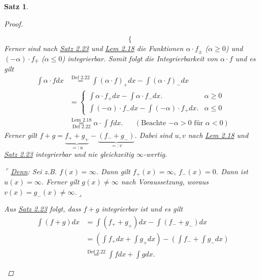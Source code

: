 \documentclass[a4paper]{report}
\newcommand{\jemph}{\uline}
\newcommand{\jshortlink}[1]{\jhyperref{#1}{\text{#1}}}
\newcommand{\jhyperref}[2]{\hyperref[j_#1]{#2}}
\newcommand{\jlink}[1]{\jhyperref{#1}{#1}}
\newcommand{\jspacesmall}{\vspace{4pt}}
\theoremstyle{plain}
\newtheorem{satz}[thm]{Satz}
\theoremstyle{definition}
\begin{document}
{{{{\begin{satz}
\begin{proof}
\begin{enumerate}
\begin{displaymath}
\begin{cases}
                                          \end{cases}
                \end{displaymath}
                Ferner sind nach \jlink{Satz 2.23} und \jlink{Lem 2.18} die Funktionen $\alpha\cdot f_\pm$ ($\alpha \ge 0$) und $(-\alpha)\cdot f_\mp$ ($\alpha \le 0$) integrierbar. Somit folgt die Integrierbarkeit von $\alpha\cdot f$ und es gilt
                \begin{displaymath}
                    \begin{split}
                        \int \alpha\cdot f dx &\overset{\jshortlink{Def 2.22}}{=} \int (\alpha\cdot f)_+ dx - \int (\alpha\cdot f)_-dx\\
                        &= \begin{cases}
                               \int \alpha\cdot f_+ dx - \int \alpha \cdot f_- dx. &\alpha \ge 0\\
                               \int (-\alpha)\cdot f_-dx - \int (-\alpha)\cdot f_+dx. &\alpha \le 0
                           \end{cases}\\
                        &\overset{\jshortlink{Lem 2.18}}{\underset{\jshortlink{Def 2.22}}{=}} \alpha\cdot \int fdx. \hspace{20pt} (\text{Beachte $-\alpha > 0$ für $\alpha < 0$})
                    \end{split}
                \end{displaymath}
                Ferner gilt $f+g = \underbrace{f_+ + g_+}_{=:u} - \underbrace{(f_- + g_-)}_{=:v}$. Dabei sind $u,v$ nach \jlink{Lem 2.18} und \jlink{Satz 2.23} integrierbar und nie gleichzeitig $\infty$-wertig.
                
                \jspacesmall
                
                $\ulcorner$\jemph{Denn}: Sei z.B. $f(x)=\infty$. Dann gilt $f_+(x)=\infty, \ f_-(x)=0$. Dann ist $u(x) =\infty$. Ferner gilt $g(x)\ne \infty$ nach Voraussetzung, woraus $v(x) = g_-(x) \ne \infty$.$\lrcorner$
                
                \jspacesmall
                
                Aus \jlink{Satz 2.23} folgt, dass $f+g$ integrierbar ist und es gilt
                \begin{displaymath}
                    \begin{split}
                        \int(f+g)dx &= \int(f_+ + g_+)dx - \int(f_- + g_-)dx\\
                        &= \left(\int f_+dx + \int g_+dx \right) - \left(\int f_- + \int g_- dx \right)\\
                        &\overset{\jshortlink{Def 2.22}}{=} \int f dx + \int g dx.
                    \end{split}
                \end{displaymath}
                

\end{enumerate}
\end{proof}
\end{satz}}}}}
\end{document}

